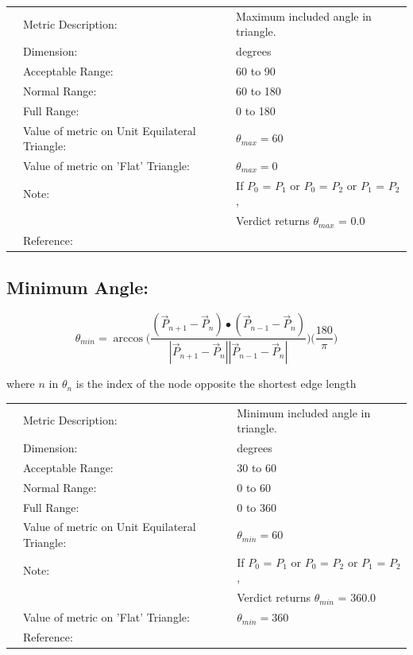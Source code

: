 \documentclass[12pt]{article}
\begin{document}
\begin{tabular}{lll}
& Metric Description:  & Maximum included angle in triangle. \\
& Dimension:           & degrees                             \\ 
& Acceptable Range:    & 60 to 90                            \\ 
& Normal Range:        & 60 to 180                           \\ 
& Full Range:          & 0 to 180                           \\ 
& Value of metric on Unit Equilateral Triangle:       & $\theta_{max}= 60 $ \\
& Value of metric on 'Flat' Triangle:  & $\theta_{max} = 0 $\\
& Note:                & If $P_0$ = $P_1$ or $P_0$ = $P_2$ or $P_1$ = $P_2$, \\
&                      & Verdict returns $\theta_{max}$ = 0.0  \\
& Reference:           & \cite{three} \\ 
\end{tabular} 


\subsection*{Minimum Angle:}

\begin{displaymath}
\theta_{min}= \arccos{\Bigg( \frac {(\vec P_{n+1} - \vec P_n) \bullet (\vec P_{n-1} - \vec P_n)}
                 {|\vec P_{n+1} - \vec P_n | |\vec P_{n-1} - \vec P_n| } \Bigg) }
                 \Bigg( \frac {180} {\pi} \Bigg)
\end{displaymath}

\begin{flushleft}
where $n$ in $\theta_n$ is the index of the node opposite the shortest edge length
\end{flushleft}

\begin{tabular}{lll}
& Metric Description:  & Minimum included angle in triangle. \\
& Dimension:           & degrees                             \\ 
& Acceptable Range:    & 30 to 60                            \\ 
& Normal Range:        & 0 to 60                           \\ 
& Full Range:          & 0 to 360                           \\ 
& Value of metric on Unit Equilateral Triangle:       & $\theta_{min}= 60 $ \\
& Note:                & If $P_0$ = $P_1$ or $P_0$ = $P_2$ or $P_1$ = $P_2$, \\
&                      & Verdict returns $\theta_{min}$ = 360.0  \\
& Value of metric on 'Flat' Triangle:  & $\theta_{min} = 360$ \\
& Reference:           & \cite{three}  \\
\end{tabular} 
\end{document}

